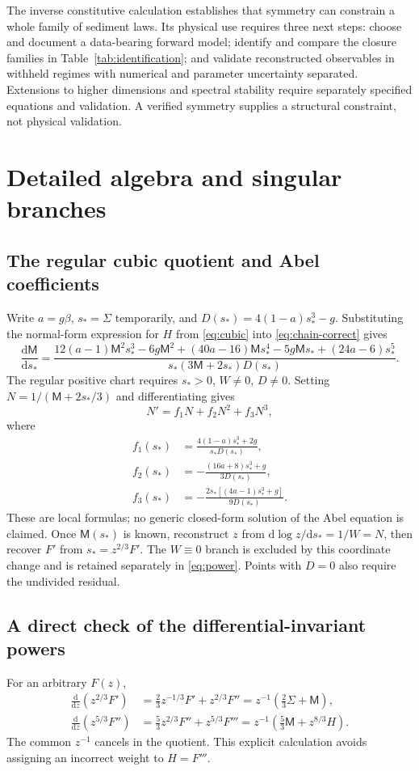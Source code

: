 \documentclass[11pt,a4paper,oneside]{report}
\numberwithin{equation}{chapter}
\newcommand{\dd}{\mathrm d}
\begin{document}
The inverse constitutive calculation establishes that symmetry can constrain a whole family of sediment laws. Its physical use requires three next steps: choose and document a data-bearing forward model; identify and compare the closure families in Table~\ref{tab:identification}; and validate reconstructed observables in withheld regimes with numerical and parameter uncertainty separated. Extensions to higher dimensions and spectral stability require separately specified equations and validation. A verified symmetry supplies a structural constraint, not physical validation.

\appendix
\chapter{Detailed algebra and singular branches}\label{app:algebra}
\section{The regular cubic quotient and Abel coefficients}
Write $a=g\beta$, $s_*=\Sigma$ temporarily, and
$D(s_*)=4(1-a)s_*^3-g$. Substituting the normal-form expression for $H$ from \eqref{eq:cubic} into \eqref{eq:chain-correct} gives
\begin{equation}\label{eq:quotient-explicit}
\frac{\dd\mathsf M}{\dd s_*}=
\frac{12(a-1)\mathsf M^2s_*^3-6g\mathsf M^2
 +(40a-16)\mathsf M s_*^4-5g\mathsf M s_*
 +(24a-6)s_*^5}{s_*(3\mathsf M+2s_*)D(s_*)}.
\end{equation}
The regular positive chart requires $s_*>0$, $W\ne0$, $D\ne0$. Setting $N=1/(\mathsf M+2s_*/3)$ and differentiating gives
\begin{equation}
N'=f_1N+f_2N^2+f_3N^3,
\end{equation}
where
\begin{align}
f_1(s_*)&=\frac{4(1-a)s_*^3+2g}{s_*D(s_*)},\\
f_2(s_*)&=-\frac{(16a+8)s_*^3+g}{3D(s_*)},\\
f_3(s_*)&=-\frac{2s_*[(4a-1)s_*^3+g]}{9D(s_*)}.
\end{align}
These are local formulas; no generic closed-form solution of the Abel equation is claimed. Once $\mathsf M(s_*)$ is known, reconstruct $z$ from
$\dd\log z/\dd s_*=1/W=N$, then recover $F'$ from $s_*=z^{2/3}F'$. The $W\equiv0$ branch is excluded by this coordinate change and is retained separately in \eqref{eq:power}. Points with $D=0$ also require the undivided residual.

\section{A direct check of the differential-invariant powers}
For an arbitrary $F(z)$,
\begin{align}
\frac{\dd}{\dd z}(z^{2/3}F')
 &=\tfrac23z^{-1/3}F'+z^{2/3}F''
 =z^{-1}(\tfrac23\Sigma+\mathsf M),\\
\frac{\dd}{\dd z}(z^{5/3}F'')
 &=\tfrac53z^{2/3}F''+z^{5/3}F'''
 =z^{-1}(\tfrac53\mathsf M+z^{8/3}H).
\end{align}
The common $z^{-1}$ cancels in the quotient. This explicit calculation avoids assigning an incorrect weight to $H=F'''$.
\end{document}
